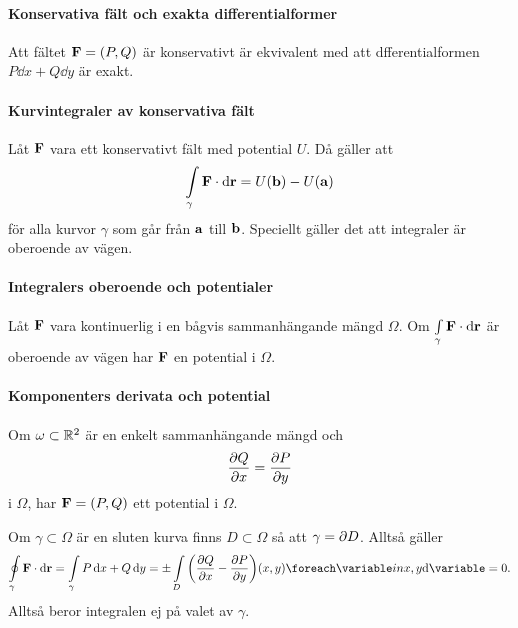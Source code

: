 \proof

\paragraph{Konservativa fält och exakta differentialformer}
Att fältet $\vect{F} = (P, Q)$ är konservativt är ekvivalent med att dfferentialformen $P\dd{x} + Q\dd{y}$ är exakt.

\proof

\paragraph{Kurvintegraler av konservativa fält}
Låt $\vect{F}$ vara ett konservativt fält med potential $U$. Då gäller att
\begin{align*}
	\cint{\gamma}{\vect{F}}{\vect{r}} = U(\vect{b}) - U(\vect{a})
\end{align*}
för alla kurvor $\gamma$ som går från $\vect{a}$ till $\vect{b}$. Speciellt gäller det att integraler är oberoende av vägen.

\proof

\paragraph{Integralers oberoende och potentialer}
Låt $\vect{F}$ vara kontinuerlig i en bågvis sammanhängande mängd $\Omega$. Om $\cint{\gamma}{\vect{F}}{\vect{r}}$ är oberoende av vägen har $\vect{F}$ en potential i $\Omega$.

\proof

\paragraph{Komponenters derivata och potential}
Om $\omega\subset\mathbb{R}^2$ är en enkelt sammanhängande mängd och
\begin{align*}
	\pdv{Q}{x} = \pdv{P}{y}
\end{align*}
i $\Omega$, har $\vect{F} = (P, Q)$ ett potential i $\Omega$.

\proof
Om $\gamma\subset\Omega$ är en sluten kurva finns $D\subset\Omega$ så att $\gamma = \partial D$. Alltså gäller
\begin{align*}
	\cint[c]{\gamma}{\vect{F}}{\vect{r}} = \int\limits_{\gamma}P\dd{x} + Q\dd{y} = \pm\inteval{D}{\left(\pdv{Q}{x} - \pdv{P}{y}\right)}{{x, y}} = 0.
\end{align*}
Alltså beror integralen ej på valet av $\gamma$.